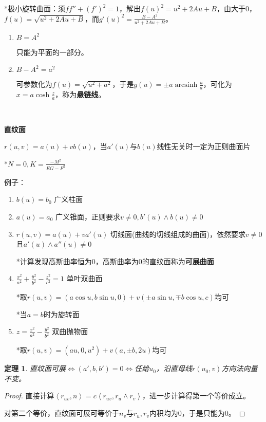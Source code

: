 \documentclass[a4paper,UTF8,fontset=windows]{ctexart}
\DeclareMathOperator{\arcsinh}{arcsinh}
\newtheorem{thm}{定理}[section]
\begin{document}
*极小旋转曲面：须$ff''+(f')^2=1$，解出$f(u)^2=u^2+2Au+B$，由大于0，$f(u)=\sqrt{u^2+2Au+B}$，而$g'(u)^2=\frac{B-A^2}{u^2+2Au+B}$。

\begin{enumerate}
\item
$B=A^2$

只能为平面的一部分。

\item
$B-A^2=a^2$

可参数化为$f(u)=\sqrt{u^2+a^2}$，于是$g(u)=\pm a\arcsinh\frac{u}{a}$，可化为$x=a\cosh\frac{z}{a}$，称为\textbf{悬链线}。
\end{enumerate}

\

\textbf{直纹面}

$r(u,v)=a(u)+vb(u)$，当$a'(u)$与$b(u)$线性无关时一定为正则曲面片

*$N=0,K=\frac{-M^2}{EG-F^2}$

例子：

\begin{enumerate}
\item
$b(u)=b_0$ 广义柱面

\item
$a(u)=a_0$ 广义锥面，正则要求$v\ne0,b'(u)\wedge b(u)\ne0$

\item
$r(u,v)=a(u)+va'(u)$ 切线面(曲线的切线组成的曲面)，依然要求$v\ne0$且$a'(u)\wedge a''(u)\ne0$

*计算发现高斯曲率恒为0，高斯曲率为0的直纹面称为\textbf{可展曲面}

\item
$\frac{x^2}{a^2}+\frac{y^2}{b^2}-\frac{z^2}{c^2}=1$ 单叶双曲面

*取$r(u,v)=(a\cos u,b\sin u,0)+v(\pm a\sin u,\mp b\cos u,c)$均可

*当$a=b$时为旋转面

\item
$z=\frac{x^2}{a^2}-\frac{y^2}{b^2}$ 双曲抛物面

*取$r(u,v)=(au,0,u^2)+v(a,\pm b,2u)$均可
\end{enumerate}

\begin{thm}
直纹面可展$\Longleftrightarrow(a',b,b')=0\Longleftrightarrow$任给$u_0$，沿直母线$r(u_0,v)$方向法向量不变。
\end{thm}

\begin{proof}
直接计算$\left<r_{uv},n\right>=c\left<r_{uv},r_u\wedge r_v\right>$，进一步计算得第一个等价成立。

对第二个等价，直纹面可展可等价于$n_v$与$r_u,r_v$内积均为0，于是只能为0。
\end{proof}
\end{document}
